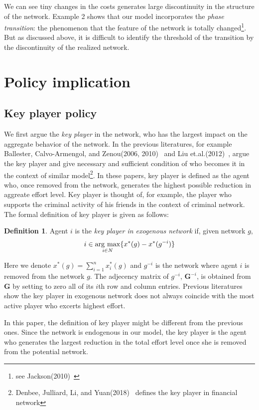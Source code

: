 \documentclass[12pt]{article}
\theoremstyle{definition}
\newtheorem{definition}{Definition}
\newcommand{\bm}[1]{\boldsymbol{#1}}
\newcommand{\argmax}{\mathop{\rm arg~max}\limits}
\begin{document}
We can see tiny changes in the costs generates large discontinuity in the structure of the network.
Example 2 shows that our model incorporates the {\it{phase transition}}: the phenomenon that the feature of the network is totally changed\footnote{see Jackson(2010)~\cite{social}}.
But as discussed above, it is difficult to identify the threshold of the transition by the discontinuity of the realized network.


\section{Policy implication}

\subsection{Key player policy}

We first argue the {\it{key player}} in the network, who has the largest impact on the aggregate behavior of the network.
In the previous literatures, for example Ballester, Calvo-Armengol, and Zenou(2006, 2010)~\cite{whowho, delinquent} and Liu et.al.(2012)~\cite{criminal}, argue the key player and give necessary and sufficient condition of who becomes it in the context of similar model\footnote{Denbee, Julliard, Li, and Yuan(2018)~\cite{denbee} defines the key player in financial network}.
In these papers, key player is defined as the agent who, once removed from the network, generates the highest possible reduction in aggreate effort level.
Key player is thought of, for example, the player who supports the criminal activity of his friends in the context of criminal network.
The formal definition of key player is given as follows:

\begin{definition}
Agent $i$ is the {\it{key player in exogenous network}} if, given network $g$,
\[ i \in \argmax_{i \in N} \{ x^*(g) - x^*(g^{-i}) \} \]
\end{definition}

Here we denote $x^*(g) = \sum_{i=1}^n x_i^*(g)$ and $g^{-i}$ is the network where agent $i$ is removed from the network $g$.
The adjecency matrix of $g^{-i}$, $\bm{G}^{-i}$, is obtained from $\bm{G}$ by setting to zero all of its $i$th row and column entries.
Previous literatures show the key player in exogenous network does not always coincide with the most active player who excerts highest effort.

In this paper, the definition of key player might be different from the previous ones.
Since the network is endogenous in our model, the key player is the agent who generates the largest reduction in the total effort level once she is removed from the potential network.
\end{document}

